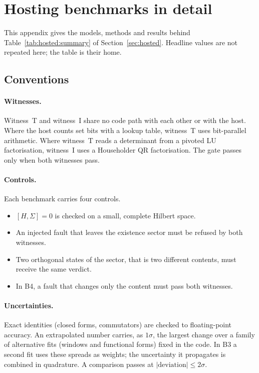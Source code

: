 \section{Hosting benchmarks in detail}\label{app:hosted}

This appendix gives the models, methods and results behind Table~\ref{tab:hosted:summary} of Section~\ref{sec:hosted}. Headline values
are not repeated here; the table is their home.

\subsection{Conventions}\label{app:hosted:conv}

\paragraph{Witnesses.} Witness~T and witness~I share no code path with each other or with the host. Where the host counts set bits with a
lookup table, witness~T uses bit-parallel arithmetic. Where witness~T reads a determinant from a pivoted LU factorisation, witness~I uses a
Householder QR factorisation. The gate passes only when both witnesses pass.

\paragraph{Controls.} Each benchmark carries four controls.
\begin{itemize}[nosep]
\item $[H,\Sigma]=0$ is checked on a small, complete Hilbert space.
\item An injected fault that leaves the existence sector must be refused by both witnesses.
\item Two orthogonal states of the sector, that is two different contents, must receive the same verdict.
\item In B4, a fault that changes only the content must pass both witnesses.
\end{itemize}

\paragraph{Uncertainties.} Exact identities (closed forms, commutators) are checked to floating-point accuracy. An extrapolated number
carries, as $1\sigma$, the largest change over a family of alternative fits (windows and functional forms) fixed in the code. In B3 a second
fit uses these spreads as weights; the uncertainty it propagates is combined in quadrature. A comparison passes at
$\vert\text{deviation}\vert\le2\sigma$.

